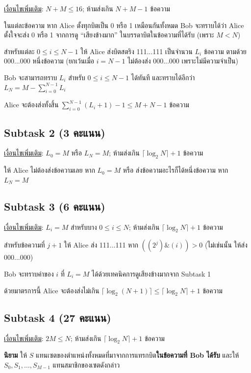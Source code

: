 \documentclass[12pt]{article}
\begin{document}
\underline{เงื่อนไขเพิ่มเติม}: $N+M \leq 16$; ห้ามส่งเกิน $N+M-1$ ข้อความ

ในแต่ละข้อความ หาก Alice ตั้งทุกบิตเป็น 0 หรือ 1 เหมือนกันทั้งหมด Bob จะทราบได้ว่า Alice ตั้งใจจะส่ง 0 หรือ 1 จากการดู “เสียงข้างมาก” ในบรรดาบิตในข้อความที่ได้รับ (เพราะ $M < N$)

สำหรับแต่ละ $0 \leq i \leq N-1$  ให้ Alice ส่งบิตสตริง 111...111 เป็นจำนวน $L_i$ ข้อความ ตามด้วย 000...000 หนึ่งข้อความ (ยกเว้นเมื่อ $i=N-1$ ไม่ต้องส่ง 000...000 เพราะไม่มีความจำเป็น)

Bob จะสามารถทราบ $L_i$ สำหรับ $0 \leq i \leq N-1$ ได้ทันที และทราบได้อีกว่า $L_N=M- \sum\limits_{i=0}^{N-1}L_i$

Alice จะต้องส่งทั้งสิ้น $\sum\limits_{i=0}^{N-1}(L_i+1)-1 \leq M+N-1$ ข้อความ

\subsection{Subtask 2 (3 คะแนน)}

\underline{เงื่อนไขเพิ่มเติม}: $L_0 = M$ หรือ $L_N = M$; ห้ามส่งเกิน $\lceil \log_2 N \rceil + 1$ ข้อความ

ให้ Alice ไม่ต้องส่งข้อความเลย หาก $L_0=M$ หรือ ส่งข้อความอะไรก็ได้หนึ่งข้อความ หาก $L_N=M$

\subsection{Subtask 3 (6 คะแนน)}

\underline{เงื่อนไขเพิ่มเติม}: $L_i = M$ สำหรับบาง $0 \leq i \leq N$; ห้ามส่งเกิน $\lceil \log_2 N \rceil + 1$ ข้อความ

สำหรับข้อความที่ $j+1$  ให้ Alice ส่ง 111...111 หาก $((2^j) \& (i)) > 0$ (ไม่เช่นนั้น ให้ส่ง 000...000)

Bob จะทราบค่าของ $i$ ที่ $L_i=M$ ได้ด้วยเทคนิคการดูเสียงข้างมากจาก Subtask 1

ด้วยมาตรการนี้ Alice จะต้องส่งไม่เกิน $\lceil\log_2(N+1) \rceil \leq \lceil \log_2 N \rceil + 1$ ข้อความ

\subsection{Subtask 4 (27 คะแนน)}

\underline{เงื่อนไขเพิ่มเติม}: $2M \leq N$; ห้ามส่งเกิน $\lceil \log_2 N \rceil + 1$ ข้อความ

\textbf{นิยาม} ให้ $S$ แทนเซตของตำแหน่งทั้งหมดที่มาจากการแทรกบิต\textbf{ในข้อความที่ Bob ได้รับ} และให้ $S_0, S_1, \ldots, S_{M-1}$ แทนสมาชิกของเซตดังกล่าว
\end{document}
